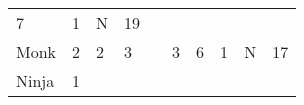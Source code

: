 \documentclass[12pt]{article}
\begin{document}
\begin{longtable}[]{@{}llllllllll@{}}
\begin{minipage}[t]{0.06\columnwidth}
7
\strut\end{minipage} &
\begin{minipage}[t]{0.06\columnwidth}\raggedright\strut
1
\strut\end{minipage} &
\begin{minipage}[t]{0.07\columnwidth}\raggedright\strut
N
\strut\end{minipage} &
\begin{minipage}[t]{0.08\columnwidth}\raggedright\strut
19
\strut\end{minipage}\tabularnewline
\begin{minipage}[t]{0.13\columnwidth}\raggedright\strut
Monk
\strut\end{minipage} &
\begin{minipage}[t]{0.06\columnwidth}\raggedright\strut
2
\strut\end{minipage} &
\begin{minipage}[t]{0.06\columnwidth}\raggedright\strut
2
\strut\end{minipage} &
\begin{minipage}[t]{0.06\columnwidth}\raggedright\strut
3
\strut\end{minipage} &
\begin{minipage}[t]{0.06\columnwidth}\raggedright\strut
\strut\end{minipage} &
\begin{minipage}[t]{0.06\columnwidth}\raggedright\strut
3
\strut\end{minipage} &
\begin{minipage}[t]{0.06\columnwidth}\raggedright\strut
6
\strut\end{minipage} &
\begin{minipage}[t]{0.06\columnwidth}\raggedright\strut
1
\strut\end{minipage} &
\begin{minipage}[t]{0.07\columnwidth}\raggedright\strut
N
\strut\end{minipage} &
\begin{minipage}[t]{0.08\columnwidth}\raggedright\strut
17
\strut\end{minipage}\tabularnewline
\begin{minipage}[t]{0.13\columnwidth}\raggedright\strut
Ninja
\strut\end{minipage} &
\begin{minipage}[t]{0.06\columnwidth}\raggedright\strut
1
\strut\end{minipage} &
\begin{minipage}[t]{0.06\columnwidth}\raggedright\strut

\end{minipage}
\end{longtable}
\end{document}
